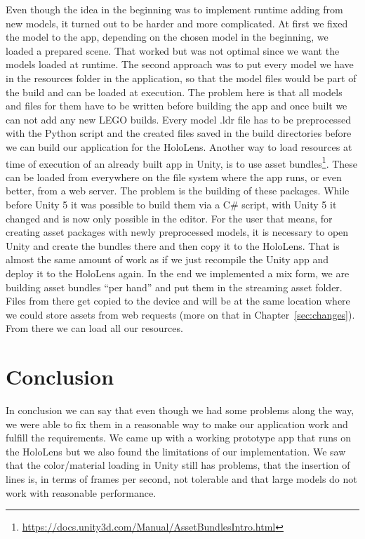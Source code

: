 \begin{description}[align=left]
	\item[Runtime model adding]
	Even though the idea in the beginning was to implement runtime adding from new models, it turned out to be harder and more complicated. At first we fixed the model to the app, depending on the chosen model in the beginning, we loaded a prepared scene. That worked but was not optimal since we want the models loaded at runtime. \newline 
	The second approach was to put every model we have in the resources folder in the application, so that the model files would be part of the build and can be loaded at execution. The problem here is that all models and files for them have to be written before building the app and once built we can not add any new LEGO builds. Every model .ldr file has to be preprocessed with the Python script and the created files saved in the build directories before we can build our application for the HoloLens. \newline 
	Another way to load resources at time of execution of an already built app in Unity, is to use asset bundles\footnote{\url{https://docs.unity3d.com/Manual/AssetBundlesIntro.html}}. These can be loaded from everywhere on the file system where the app runs, or even better, from a web server. The problem is the building of these packages. While before Unity 5 it was possible to build them via a C\# script, with Unity 5 it changed and is now only possible in the editor. \newline 
	For the user that means, for creating asset packages with newly preprocessed models, it is necessary to open Unity and create the bundles there and then copy it to the HoloLens. That is almost the same amount of work as if we just recompile the Unity app and deploy it to the HoloLens again. In the end we implemented a mix form, we are building asset bundles ``per hand'' and put them in the streaming asset folder. Files from there get copied to the device and will be at the same location where we could store assets from web requests (more on that in Chapter~\ref{sec:changes}). From there we can load all our resources.
	
\end{description}

\section{Conclusion}

In conclusion we can say that even though we had some problems along the way, we were able to fix them in a reasonable way to make our application work and fulfill the requirements. We came up with a working prototype app that runs on the HoloLens but we also found the limitations of our implementation. We saw that the color/material loading in Unity still has problems, that the insertion of lines is, in terms of frames per second, not tolerable and that large models do not work with reasonable performance.	